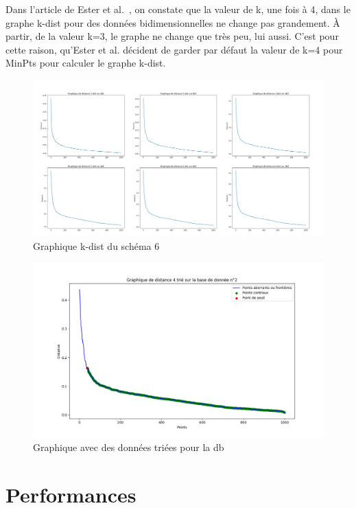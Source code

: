 \documentclass[
  oneside]{memoire-umons}
\begin{document}
Dans l'article de Ester et al.~, on constate que la
valeur de k, une fois à 4, dans le graphe k-dist pour des données
bidimensionnelles ne change pas grandement. À partir, de la valeur k=3,
le graphe ne change que très peu, lui aussi. C'est pour cette raison,
qu'Ester et al. décident de garder par défaut la
valeur de k=4 pour MinPts pour calculer le graphe k-dist.

\begin{figure}
\centering
\includegraphics{src/memoire-umons/images/new_versions/k_dist_trie_db2.png}
\caption{Graphique k-dist du schéma 6 \label{k_dist}}
\end{figure}

\begin{figure}
\centering
\includegraphics{src/memoire-umons/images/new_versions/k_dist_db2.png}
\caption{Graphique avec des données triées pour la db
\label{k_dist_trie}}
\end{figure}

\chapter{Performances}
\end{document}
